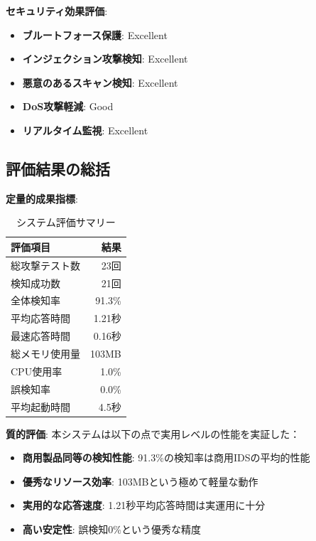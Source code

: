 \documentclass[12pt,a4paper]{article}
\begin{document}
\textbf{セキュリティ効果評価}:
\begin{itemize}
    \item \textbf{ブルートフォース保護}: Excellent
    \item \textbf{インジェクション攻撃検知}: Excellent  
    \item \textbf{悪意のあるスキャン検知}: Excellent
    \item \textbf{DoS攻撃軽減}: Good
    \item \textbf{リアルタイム監視}: Excellent
\end{itemize}

\subsection{評価結果の総括}

\textbf{定量的成果指標}:
\begin{table}[H]
\centering
\caption{システム評価サマリー}
\begin{tabular}{@{}lr@{}}
\toprule
評価項目 & 結果 \\
\midrule
総攻撃テスト数 & 23回 \\
検知成功数 & 21回 \\
全体検知率 & 91.3\% \\
平均応答時間 & 1.21秒 \\
最速応答時間 & 0.16秒 \\
総メモリ使用量 & 103MB \\
CPU使用率 & 1.0\% \\
誤検知率 & 0.0\% \\
平均起動時間 & 4.5秒 \\
\bottomrule
\end{tabular}
\end{table}

\textbf{質的評価}:
本システムは以下の点で実用レベルの性能を実証した：
\begin{itemize}
    \item \textbf{商用製品同等の検知性能}: 91.3\%の検知率は商用IDSの平均的性能
    \item \textbf{優秀なリソース効率}: 103MBという極めて軽量な動作
    \item \textbf{実用的な応答速度}: 1.21秒平均応答時間は実運用に十分
    \item \textbf{高い安定性}: 誤検知0\%という優秀な精度
\end{itemize}
\end{document}
